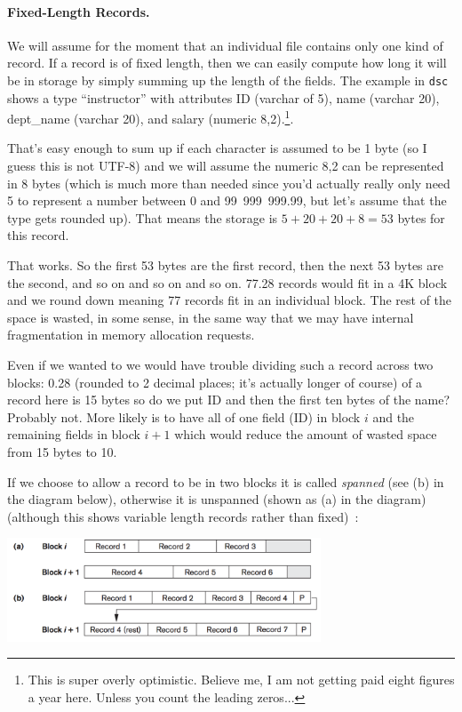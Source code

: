 \paragraph{Fixed-Length Records.} 

We will assume for the moment that an individual file contains only one kind of record. If a record is of fixed length, then we can easily compute how long it will be in storage by simply summing up the length of the fields. The example in \texttt{dsc} shows a type ``instructor'' with attributes ID (varchar of 5), name (varchar 20), dept\_name (varchar 20), and salary (numeric 8,2).\footnote{This is super overly optimistic. Believe me, I am not getting paid eight figures a year here. Unless you count the leading zeros...}. 

That's easy enough to sum up if each character is assumed to be 1 byte (so I guess this is not UTF-8) and we will assume the numeric 8,2 can be represented in 8 bytes (which is much more than needed since you'd actually really only need 5 to represent a number between 0 and 99~999~999.99, but let's assume that the type gets rounded up). That means the storage is $5 + 20 + 20 + 8 = 53$ bytes for this record. 

That works. So the first 53 bytes are the first record, then the next 53 bytes are the second, and so on and so on and so on. 77.28 records would fit in a 4K block and we round down meaning 77 records fit in an individual block. The rest of the space is wasted, in some sense, in the same way that we may have internal fragmentation in memory allocation requests. 

Even if we wanted to we would have trouble dividing such a record across two blocks: 0.28 (rounded to 2 decimal places; it's actually longer of course) of a record here is 15 bytes so do we put ID and then the first ten bytes of the name? Probably not. More likely is to have all of one field (ID) in block $i$ and the remaining fields in block $i+1$ which would reduce the amount of wasted space from 15 bytes to 10. 

If we choose to allow a record to be in two blocks it is called \textit{spanned} (see (b) in the diagram below), otherwise it is unspanned (shown as (a) in the diagram) (although this shows variable length records rather than fixed)~\cite{fds}:

\begin{center}
\includegraphics[width=0.7\textwidth]{images/spanned-unspanned}
\end{center}

